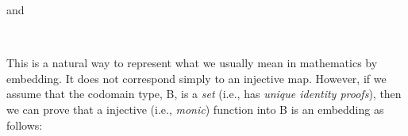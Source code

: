 \ccpad
and
\ccpad
\begin{code}
\>[0]\AgdaSpace{}%
\AgdaSymbol{:}\AgdaSpace{}%
\AgdaSymbol{\{}\AgdaSpace{}%
\AgdaSymbol{:}\AgdaSpace{}%
\AgdaSpace{}%
\AgdaSpace{}%
\AgdaSymbol{\}}\AgdaSpace{}%
\AgdaSymbol{\{}\AgdaSpace{}%
\AgdaSymbol{:}\AgdaSpace{}%
\AgdaSpace{}%
\AgdaSpace{}%
\AgdaSymbol{\}}\AgdaSpace{}%
\AgdaSymbol{(}\AgdaSpace{}%
\AgdaSymbol{:}\AgdaSpace{}%
\AgdaSpace{}%
\AgdaSpace{}%
\AgdaSymbol{)}\AgdaSpace{}%
\AgdaSpace{}%
\AgdaSpace{}%
\AgdaSpace{}%
\AgdaSpace{}%
\AgdaSpace{}%
\AgdaSpace{}%
\<%
\\
\>[0]\AgdaSpace{}%
\AgdaSpace{}%
\AgdaSpace{}%
\AgdaSymbol{=}\AgdaSpace{}%
\AgdaSpace{}%
\AgdaSpace{}%
\AgdaSpace{}%
\AgdaSpace{}%
\AgdaSpace{}%
\AgdaFunction{,}\AgdaSpace{}%
\AgdaSpace{}%
\AgdaSpace{}%
\AgdaSpace{}%
\<%
\end{code}
\ccpad
This is a natural way to represent what we usually mean in mathematics by embedding. It does not correspond simply to an injective map. However, if we assume that the codomain type, \ab B, is a \emph{set} (i.e., has \emph{unique identity proofs}), then we can prove that a injective (i.e., \emph{monic}) function into \ab B is an embedding as follows:
\ccpad
